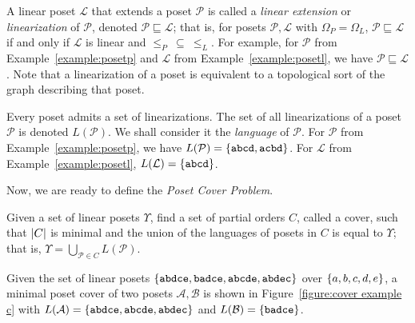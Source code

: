 \documentclass[12pt]{llncs}
\DeclarePairedDelimiter{\set}{\{}{\}}
\DeclarePairedDelimiter{\abs}{\lvert}{\rvert}
\let\oldleq\leq
\renewcommand{\leq}[1][]{\oldleq_{#1}}
\newcommand{\poset}[1]{\mathcal{#1}}
\newcommand{\uni}[1][]{\Omega_{#1}}
\newcommand{\lang}[1]{L(#1)}
\newcommand{\lin}[1]{\texttt{#1}}
\newcommand{\lext}{\sqsubseteq}
\begin{document}
A linear poset $\poset{L}$ that extends a poset $\poset{P}$ is called a \emph{linear extension} or \emph{linearization} of $\poset{P}$, denoted $\poset{P} \lext \poset{L}$; that is, for posets $\poset{P},\poset{L}$ with $\uni[P] \!=\! \uni[L]$, $\poset{P} \lext \poset{L}$ if and only if $\poset{L}$ is linear and $\leq[P] \>\subseteq\> \leq[L]$. For example, for $\poset{P}$ from Example~\ref{example:posetp} and $\poset{L}$ from Example~\ref{example:posetl}, we have $\poset{P} \lext \poset{L}$. Note that a linearization of a poset is equivalent to a topological sort of the graph describing that poset.

Every poset admits a set of linearizations. The set of all linearizations of a poset $\poset{P}$ is denoted $\lang{\poset{P}}$. We shall consider it the \emph{language} of $\poset{P}$. For $\poset{P}$ from Example~\ref{example:posetp}, we have $\lang{\poset{P}} = \set{\lin{abcd},\lin{acbd}}$. For $\poset{L}$ from Example~\ref{example:posetl}, $\lang{\poset{L}} = \set{\lin{abcd}}$.

Now, we are ready to define the \emph{Poset Cover Problem}.

\begin{definition}
    Given a set of linear posets $\Upsilon$, find a set of partial orders $C$, called a cover, such that $\abs{C}$ is minimal and the union of the languages of posets in $C$ is equal to $\Upsilon$; that is, $\Upsilon = \bigcup_{\poset{P} \in C} \lang{\poset{P}}$.
    \label{definition:pcp}
\end{definition}

\begin{example}
    Given the set of linear posets $\set{\lin{abdce},\lin{badce},\lin{abcde},\lin{abdec}}$ over $\set{a,b,c,d,e}$, a minimal poset cover of two posets $\poset{A},\poset{B}$ is shown in Figure~\ref{figure:cover example c} with ${\lang{\poset{A}} = \set{\lin{abdce},\lin{abcde},\lin{abdec}}}$ and ${\lang{\poset{B}} = \set{\lin{badce}}}$.
    \label{example:cover example}
\end{example}
\end{document}
